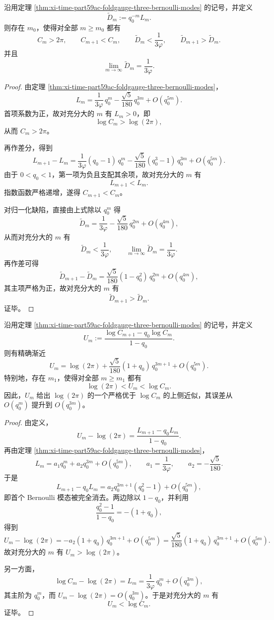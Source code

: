 \begin{theorem}\label{thm:xi-time-part59ac-foldgauge-normalized-defect-monotone}
沿用定理 \ref{thm:xi-time-part59ac-foldgauge-three-bernoulli-modes} 的记号，并定义
\[
\widetilde D_m:=q_0^{-m}L_m.
\]
则存在 \(m_0\)，使得对全部 \(m\ge m_0\) 都有
\[
C_m>2\pi,
\qquad
C_{m+1}<C_m,
\qquad
\widetilde D_m<\frac{1}{3\varphi},
\qquad
\widetilde D_{m+1}>\widetilde D_m.
\]
并且
\[
\lim_{m\to\infty}\widetilde D_m=\frac{1}{3\varphi}.
\]
\end{theorem}
\begin{proof}
由定理 \ref{thm:xi-time-part59ac-foldgauge-three-bernoulli-modes}，
\[
L_m
=
\frac{1}{3\varphi}\,q_0^m
-\frac{\sqrt5}{180}\,q_0^{3m}
+O(q_0^{5m}).
\]
首项系数为正，故对充分大的 \(m\) 有 \(L_m>0\)，即
\[
\log C_m>\log(2\pi),
\]
从而 \(C_m>2\pi\)。

再作差分，得到
\[
L_{m+1}-L_m
=
\frac{1}{3\varphi}(q_0-1)\,q_0^m
-\frac{\sqrt5}{180}(q_0^3-1)\,q_0^{3m}
+O(q_0^{5m}).
\]
由于 \(0<q_0<1\)，第一项为负且支配其余项，故对充分大的 \(m\) 有
\[
L_{m+1}<L_m.
\]
指数函数严格递增，遂得 \(C_{m+1}<C_m\)。

对归一化缺陷，直接由上式除以 \(q_0^m\) 得
\[
\widetilde D_m
=
\frac{1}{3\varphi}
-\frac{\sqrt5}{180}\,q_0^{2m}
+O(q_0^{4m}),
\]
从而对充分大的 \(m\) 有
\[
\widetilde D_m<\frac{1}{3\varphi},
\qquad
\lim_{m\to\infty}\widetilde D_m=\frac{1}{3\varphi}.
\]
再作差可得
\[
\widetilde D_{m+1}-\widetilde D_m
=
\frac{\sqrt5}{180}(1-q_0^2)\,q_0^{2m}
+O(q_0^{4m}),
\]
其主项严格为正，故对充分大的 \(m\) 有
\[
\widetilde D_{m+1}>\widetilde D_m.
\]
证毕。
\end{proof}

\begin{theorem}[首项消元后的立方级超收敛上侧包络]\label{thm:xi-time-part59ac-foldgauge-first-mode-cancellation-envelope}
沿用定理 \ref{thm:xi-time-part59ac-foldgauge-three-bernoulli-modes} 的记号，并定义
\[
U_m:=\frac{\log C_{m+1}-q_0\log C_m}{1-q_0}.
\]
则有精确渐近
\[
\boxed{\;
U_m
=
\log(2\pi)
+\frac{\sqrt5}{180}(1+q_0)\,q_0^{3m+1}
+O(q_0^{5m}).\;}
\]
特别地，存在 \(m_1\)，使得对全部 \(m\ge m_1\) 都有
\[
\log(2\pi)<U_m<\log C_m.
\]
因此，\(U_m\) 给出 \(\log(2\pi)\) 的一个严格优于 \(\log C_m\) 的上侧近似，其误差从 \(O(q_0^m)\) 提升到 \(O(q_0^{3m})\)。
\end{theorem}
\begin{proof}
由定义，
\[
U_m-\log(2\pi)
=
\frac{L_{m+1}-q_0L_m}{1-q_0}.
\]
再由定理 \ref{thm:xi-time-part59ac-foldgauge-three-bernoulli-modes}，
\[
L_m
=
a_1q_0^m+a_2q_0^{3m}+O(q_0^{5m}),
\qquad
a_1=\frac{1}{3\varphi},
\qquad
a_2=-\frac{\sqrt5}{180}.
\]
于是
\[
L_{m+1}-q_0L_m
=
a_2q_0^{3m+1}(q_0^2-1)+O(q_0^{5m}),
\]
即首个 Bernoulli 模态被完全消去。两边除以 \(1-q_0\)，并利用
\[
\frac{q_0^2-1}{1-q_0}=-(1+q_0),
\]
得到
\[
U_m-\log(2\pi)
=
-a_2(1+q_0)\,q_0^{3m+1}+O(q_0^{5m})
=
\frac{\sqrt5}{180}(1+q_0)\,q_0^{3m+1}+O(q_0^{5m}).
\]
故对充分大的 \(m\) 有 \(U_m>\log(2\pi)\)。

另一方面，
\[
\log C_m-\log(2\pi)=L_m=\frac{1}{3\varphi}\,q_0^m+O(q_0^{3m}),
\]
其主阶为 \(q_0^m\)，而 \(U_m-\log(2\pi)=O(q_0^{3m})\)。于是对充分大的 \(m\) 有
\[
U_m<\log C_m.
\]
证毕。
\end{proof}

